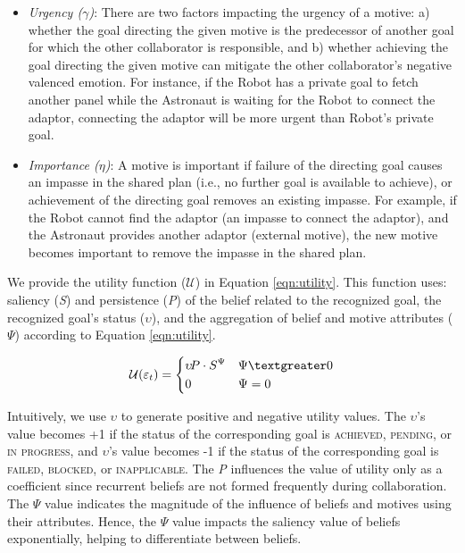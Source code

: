 \documentclass[12pt]{report}
\begin{document}
\begin{itemize}
  \setlength\itemsep{1mm}
  \item \textit{Urgency ($\gamma$)}: There are two factors impacting the urgency
  of a motive: a) whether the goal directing the given motive is the predecessor of
  another goal for which the other collaborator is responsible, and b) whether
  achieving the goal directing the given motive can mitigate the other
  collaborator's negative valenced emotion. For instance, if the Robot has a
  private goal to fetch another panel while the Astronaut is waiting for the
  Robot to connect the adaptor, connecting the adaptor will be more urgent than
  Robot's private goal.
  \item \textit{Importance ($\eta$)}: A motive is important if failure of the
  directing goal causes an impasse in the shared plan (i.e., no further goal is
  available to achieve), or achievement of the directing goal removes an
  existing impasse. For example, if the Robot cannot find the adaptor (an
  impasse to connect the adaptor), and the Astronaut provides another adaptor
  (external motive), the new motive becomes important to remove the impasse in
  the shared plan.
\end{itemize}

We provide the utility function ($\mathcal{U}$) in Equation \ref{eqn:utility}.
This function uses: saliency (\textit{S}) and persistence (\textit{P}) of the
belief related to the recognized goal, the recognized goal's status
($\upsilon$), and the aggregation of belief and motive attributes ($\Psi$)
according to Equation \ref{eqn:utility}.

\begin{equation}
    \mathcal{U}(\varepsilon_t)= 
    \begin{dcases}
       \upsilon\!P\cdot S^{\Psi} & \Psi \textgreater 0 \\
       0               			 & \Psi = 0
    \end{dcases}
    \label{eqn:utility}
\end{equation}

Intuitively, we use $\upsilon$ to generate positive and negative utility values.
The $\upsilon$'s value becomes +1 if the status of the corresponding goal is
\textsc{achieved}, \textsc{pending}, or \textsc{in progress}, and $\upsilon$'s
value becomes -1 if the status of the corresponding goal is \textsc{failed,
blocked}, or \textsc{inapplicable}. The \textit{P} influences the value of
utility only as a coefficient since recurrent beliefs are not formed frequently
during collaboration. The $\Psi$ value indicates the magnitude of the influence
of beliefs and motives using their attributes. Hence, the $\Psi$ value impacts
the saliency value of beliefs exponentially, helping to differentiate between
beliefs.
\end{document}
